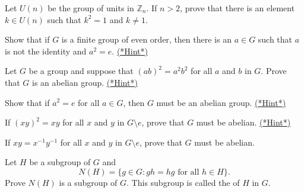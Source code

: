 \begin{exercise}{}
Let $U(n)$ be the group of units in ${\mathbb Z}_n$. If $n>2$, prove that
there is an element $k \in U(n)$ such that $k^2 = 1$ and $k \neq 1$.
\end{exercise}
 
\begin{exercise}{}\label{ex:eoc:evenInv}
Show that if $G$ is a finite group of even order, then there is an $a
\in G$ such that $a$ is not the identity and $a^2 = e$.
\hyperref[sec:groups:hints]{(*Hint*)} 
\end{exercise} 
 
 
 

\begin{exercise}{}\label{ex:eoc:abelian1}
Let $G$ be a group and suppose that $(ab)^2 = a^2b^2$ for all $a$ and
$b$ in $G$.  Prove that $G$ is an abelian group.
\hyperref[sec:groups:hints]{(*Hint*)}  
\end{exercise}

\begin{exercise}{}\label{ex:eoc:abelian2}
Show that if $a^2 = e$ for all $a \in G$, then $G$ must be an abelian group. 
\hyperref[sec:groups:hints]{(*Hint*)} 
\end{exercise}
 
\begin{exercise}{}\label{ex:groups:2elt}
If $(xy)^2 = xy$ for all $x$ and $y$ in $G \setminus {e}$, prove that $G$ must be
abelian.
\hyperref[sec:groups:hints]{(*Hint*)}
\end{exercise}

\begin{exercise}{}\label{ex:groups:abelian_proof}
If $xy = x^{-1} y^{-1}$ for all $x$ and $y$ in $G \setminus {e}$, prove that $G$
must be abelian.
\end{exercise} 
 
\begin{exercise}{}
Let $H$ be a subgroup of $G$ and
\[
N(H) = \{ g \in G : gh = hg \mbox{ for all $h \in H$}  \}.
\]
Prove $N(H)$ is a subgroup of $G$.  This subgroup is called the  of $H$ in $G$. 
\end{exercise}
 
